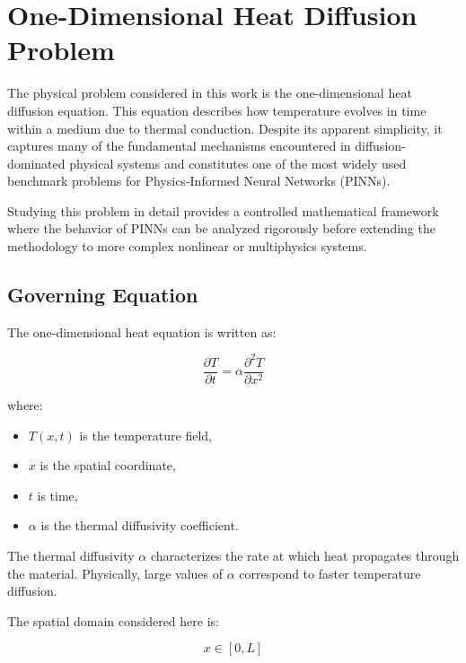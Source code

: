 \section{One-Dimensional Heat Diffusion Problem}

The physical problem considered in this work is the one-dimensional heat diffusion equation. This equation describes how temperature evolves in time within a medium due to thermal conduction. Despite its apparent simplicity, it captures many of the fundamental mechanisms encountered in diffusion-dominated physical systems and constitutes one of the most widely used benchmark problems for Physics-Informed Neural Networks (PINNs).

Studying this problem in detail provides a controlled mathematical framework where the behavior of PINNs can be analyzed rigorously before extending the methodology to more complex nonlinear or multiphysics systems.

\subsection{Governing Equation}

The one-dimensional heat equation is written as:

\begin{equation}
\frac{\partial T}{\partial t}
=
\alpha
\frac{\partial^2 T}{\partial x^2}
\end{equation}

where:
\begin{itemize}
    \item $T(x,t)$ is the temperature field,
    \item $x$ is the spatial coordinate,
    \item $t$ is time,
    \item $\alpha$ is the thermal diffusivity coefficient.
\end{itemize}

The thermal diffusivity $\alpha$ characterizes the rate at which heat propagates through the material. Physically, large values of $\alpha$ correspond to faster temperature diffusion.

The spatial domain considered here is:

\begin{equation}
x \in [0,L]
\end{equation}

